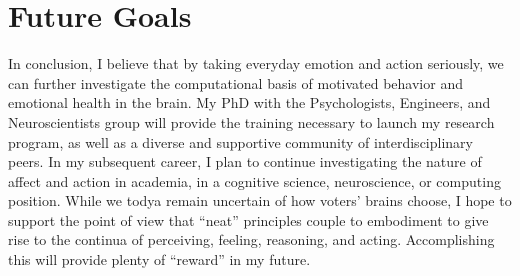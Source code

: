 \section*{Future Goals}

\begin{singlespace}
\im\bi
In conclusion, I believe that by taking everyday emotion and action
seriously, we can further investigate the computational basis of
motivated behavior and emotional health in the brain.  My PhD with the
Psychologists, Engineers, and Neuroscientists group will provide the
training necessary to launch my research program, as well as a diverse
and supportive community of interdisciplinary peers.  In my subsequent
career, I plan to continue investigating the nature of affect and action
in academia, in a cognitive science, neuroscience, or computing position.
While we todya remain uncertain of how voters' brains choose, I hope to
support the point of view that ``neat'' principles couple to embodiment
to give rise to the continua of perceiving, feeling, reasoning, and
acting.  Accomplishing this will provide plenty of ``reward'' in my
future.
\end{singlespace}
